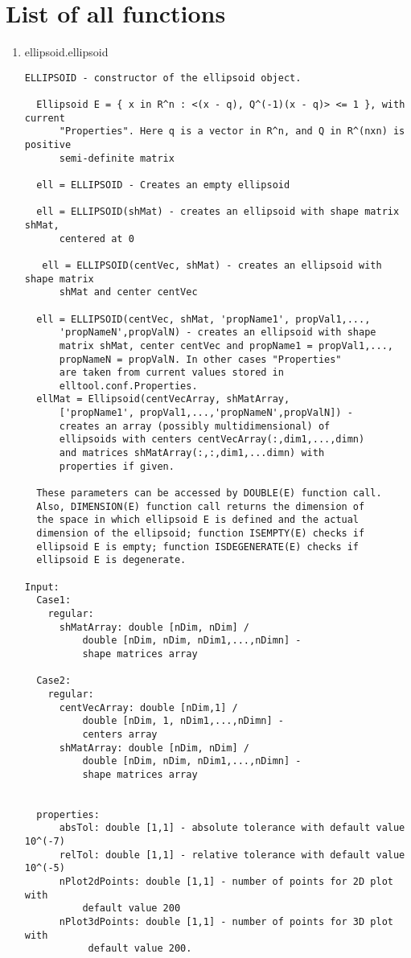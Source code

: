 \section{List of all functions}
\begin{enumerate}
\item {ellipsoid.ellipsoid}
\selectfont
\begin{lstlisting}
ELLIPSOID - constructor of the ellipsoid object.

  Ellipsoid E = { x in R^n : <(x - q), Q^(-1)(x - q)> <= 1 }, with current
      "Properties". Here q is a vector in R^n, and Q in R^(nxn) is positive
      semi-definite matrix

  ell = ELLIPSOID - Creates an empty ellipsoid

  ell = ELLIPSOID(shMat) - creates an ellipsoid with shape matrix shMat,
      centered at 0

   ell = ELLIPSOID(centVec, shMat) - creates an ellipsoid with shape matrix
      shMat and center centVec

  ell = ELLIPSOID(centVec, shMat, 'propName1', propVal1,...,
      'propNameN',propValN) - creates an ellipsoid with shape
      matrix shMat, center centVec and propName1 = propVal1,...,
      propNameN = propValN. In other cases "Properties"
      are taken from current values stored in
      elltool.conf.Properties.
  ellMat = Ellipsoid(centVecArray, shMatArray,
      ['propName1', propVal1,...,'propNameN',propValN]) -
      creates an array (possibly multidimensional) of
      ellipsoids with centers centVecArray(:,dim1,...,dimn)
      and matrices shMatArray(:,:,dim1,...dimn) with
      properties if given.

  These parameters can be accessed by DOUBLE(E) function call.
  Also, DIMENSION(E) function call returns the dimension of
  the space in which ellipsoid E is defined and the actual
  dimension of the ellipsoid; function ISEMPTY(E) checks if
  ellipsoid E is empty; function ISDEGENERATE(E) checks if
  ellipsoid E is degenerate.

Input:
  Case1:
    regular:
      shMatArray: double [nDim, nDim] /
          double [nDim, nDim, nDim1,...,nDimn] -
          shape matrices array

  Case2:
    regular:
      centVecArray: double [nDim,1] /
          double [nDim, 1, nDim1,...,nDimn] -
          centers array
      shMatArray: double [nDim, nDim] /
          double [nDim, nDim, nDim1,...,nDimn] -
          shape matrices array


  properties:
      absTol: double [1,1] - absolute tolerance with default value 10^(-7)
      relTol: double [1,1] - relative tolerance with default value 10^(-5)
      nPlot2dPoints: double [1,1] - number of points for 2D plot with
          default value 200
      nPlot3dPoints: double [1,1] - number of points for 3D plot with
           default value 200.


\end{lstlisting}
\end{enumerate}
